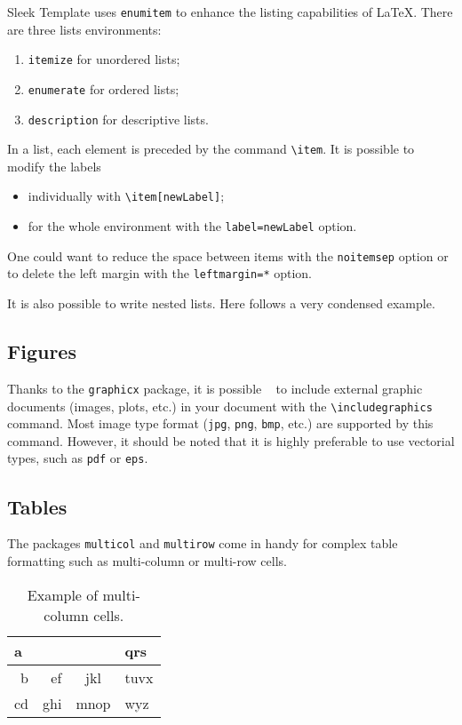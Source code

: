 \documentclass[a4paper, 12pt]{report}
\def\tbs{\textbackslash}
\begin{document}
Sleek Template uses \texttt{enumitem} to enhance the listing capabilities of \LaTeX{}. There are three lists environments:
\begin{enumerate}
	\item \texttt{itemize} for unordered lists;
	\item \texttt{enumerate} for ordered lists;
	\item \texttt{description} for descriptive lists.
\end{enumerate}

In a list, each element is preceded by the command \texttt{\tbs{}item}. It is possible to modify the labels
\begin{itemize}
	\item individually with \texttt{\tbs{}item[newLabel]};
	\item for the whole environment with the \texttt{label=newLabel} option.
\end{itemize}

One could want to reduce the space between items with the \texttt{noitemsep} option or to delete the left margin with the \texttt{leftmargin=*} option.

It is also possible to write nested lists. Here follows a very condensed example.

\subsection{Figures}

Thanks to the \texttt{graphicx} package, it is possible ~\cite{lesk:1977} to include external graphic documents (images, plots, etc.) in your document with the \texttt{\tbs{}includegraphics} command. Most image type format (\texttt{jpg}, \texttt{png}, \texttt{bmp}, etc.) are supported by this command. However, it should be noted that it is highly preferable to use vectorial types, such as \texttt{pdf} or \texttt{eps}.


\subsection{Tables}

The packages \texttt{multicol} and \texttt{multirow} come in handy for complex table formatting such as multi-column or multi-row cells.

\begin{table}[H]
	\centering
	\begin{tabular}{|r|r|c|l|}
		\hline
		\multicolumn{3}{|l|}{a} & qrs  \\ \hline
		b &  ef &     jkl      & tuvx \\ \hline
		cd & ghi &     mnop     & wyz  \\ \hline
	\end{tabular}
	\caption{Example of multi-column cells.}
	\label{tab:multicol_example}
\end{table}
\end{document}
